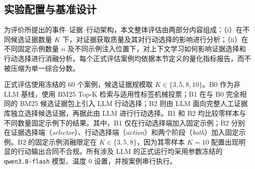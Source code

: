 \subsection{实验配置与基准设计}

为评价所提出的事件--证据--行动架构，本文整体评估由两部分内容组成：（i）在不同候选证据数量 \(K\) 下，对证据获取质量及其对行动选择的影响进行分析；（ii）在不同固定示例数量 \(n\) 及不同示例注入位置下，对上下文学习如何影响证据选择和行动选择进行消融分析。每个正式评估案例均依据本节定义的量化指标报告，而不被压缩为单一综合分数。

正式评估使用冻结的 60 个案例，候选证据规模取 \(K\in\{3,5,8,10\}\)。B0 作为非 LLM 基线，使用 BM25 Top-K 检索与适用性标签机械投票；B1 在与 B0 完全相同的 BM25 候选证据包上引入 LLM 行动选择；B2 则由 LLM 面向完整人工证据库独立选择候选证据，再据此由 LLM 进行行动选择。B1 和 B2 均比较零样本与不同数量固定示例下的结果。其中，B1 仅在行动选择端加入固定示例；B2 分别在证据选择端（\textit{selector}）、行动选择端（\textit{action}）和两个阶段（\textit{both}）加入固定示例。B2 的固定示例消融限定在 \(K\in\{3,5,8\}\)，因为其零样本 \(K=10\) 配置出现明显的行动输出合同不合规。所有涉及 LLM 的正式运行均采用参数冻结的 \texttt{qwen3.8-flash} 模型、温度 0 设置，并按案例串行执行。
